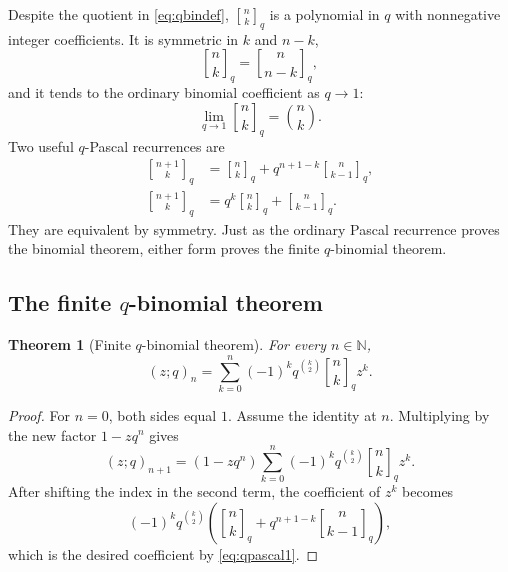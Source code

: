\documentclass[11pt,oneside]{article}
\newtheorem{theorem}{Theorem}[section]
\theoremstyle{definition}
\theoremstyle{remark}
\newcommand{\qpoch}[3]{\left(#1;#2\right)_{#3}}
\newcommand{\qbinom}[3]{{\genfrac{[}{]}{0pt}{}{#1}{#2}}_{#3}}
\newcommand{\N}{\mathbb N}
\begin{document}
Despite the quotient in \eqref{eq:qbindef}, $\qbinom{n}{k}{q}$ is a polynomial in $q$ with nonnegative integer coefficients.  It is symmetric in $k$ and $n-k$,
\begin{equation}\label{eq:qbinsymm}
 \qbinom{n}{k}{q}=\qbinom{n}{n-k}{q},
\end{equation}
and it tends to the ordinary binomial coefficient as $q\to1$:
\begin{equation}\label{eq:qbinlimit}
 \lim_{q\to1}\qbinom{n}{k}{q}=\binom nk.
\end{equation}
Two useful $q$-Pascal recurrences are
\begin{align}
 \qbinom{n+1}{k}{q}
 &=\qbinom{n}{k}{q}+q^{n+1-k}\qbinom{n}{k-1}{q},\label{eq:qpascal1}\\
 \qbinom{n+1}{k}{q}
 &=q^k\qbinom{n}{k}{q}+\qbinom{n}{k-1}{q}.
 \label{eq:qpascal2}
\end{align}
They are equivalent by symmetry.  Just as the ordinary Pascal recurrence proves the binomial theorem, either form proves the finite $q$-binomial theorem.

\subsection{The finite \texorpdfstring{$q$-binomial theorem}{q-binomial theorem}}

\begin{theorem}[Finite $q$-binomial theorem]\label{thm:finiteqbinomial}
For every $n\in\N$,
\begin{equation}\label{eq:finiteqbinomial}
 \boxed{
 \qpoch{z}{q}{n}
 =\sum_{k=0}^{n}(-1)^kq^{\binom{k}{2}}
   \qbinom{n}{k}{q}z^k.}
\end{equation}
\end{theorem}

\begin{proof}
For $n=0$, both sides equal $1$.  Assume the identity at $n$.  Multiplying by the new factor $1-zq^n$ gives
\[
 \qpoch{z}{q}{n+1}
 =(1-zq^n)\sum_{k=0}^{n}
 (-1)^kq^{\binom{k}{2}}\qbinom{n}{k}{q}z^k.
\]
After shifting the index in the second term, the coefficient of $z^k$ becomes
\[
 (-1)^kq^{\binom{k}{2}}
 \left(\qbinom{n}{k}{q}+q^{n+1-k}\qbinom{n}{k-1}{q}\right),
\]
which is the desired coefficient by \eqref{eq:qpascal1}.
\end{proof}
\end{document}
